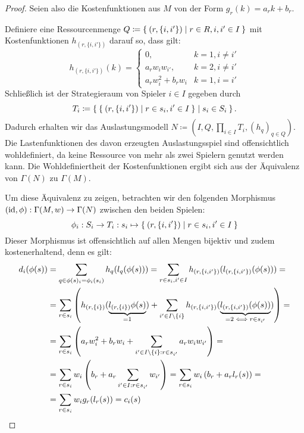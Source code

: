 \begin{proof}
	Seien also die Kostenfunktionen aus $M$ von der Form $g_r(k) = a_r k + b_r$.
	
	Definiere eine Ressourcenmenge $Q \coloneqq \Set{(r, \{i, i'\}) | r \in R, i,i' \in I}$ mit Kostenfunktionen $h_{(r, \{i,i'\})}$ darauf so, dass gilt:
		\[h_{(r, \{i,i'\})} (k) = \begin{cases}
									0, 					& k=1, i \neq i' \\
									a_r w_i w_{i'}, 	& k=2, i \neq i' \\
									a_r w_i^2 + b_r w_i	& k=1, i = i'
								\end{cases} \]
	Schließlich ist der Strategieraum von Spieler $i \in I$ gegeben durch 
		\[T_i \coloneqq \Set{\Set{(r, \{i, i'\}) | r \in s_i, i' \in I} | s_i \in S_i }.\]
	Dadurch erhalten wir das Auslastungsmodell $N \coloneqq (I, Q, \prod_{i \in I} T_i, (h_q)_{q \in Q})$. Die Lastenfunktionen des davon erzeugten Auslastungsspiel sind offensichtlich wohldefiniert, da keine Ressource von mehr als zwei Spielern genutzt werden kann. Die Wohldefiniertheit der Kostenfunktionen ergibt sich aus der Äquivalenz von $\Gamma(N)$ zu $\Gamma(M)$.
	
	Um diese Äquivalenz zu zeigen, betrachten wir den folgenden Morphismus $(\mathrm{id}, \phi): \Gamma(M,w) \to \Gamma(N)$ zwischen den beiden Spielen:
	\[\phi_i: S_i \to T_i: s_i \mapsto \Set{(r, \{i, i'\}) | r \in s_i, i' \in I}\]
	Dieser Morphismus ist offensichtlich auf allen Mengen bijektiv und zudem kostenerhaltend, denn es gilt:
	\begin{align*}
	d_i(\phi(s)) 	&= \sum_{q \in \phi(s)_i = \phi_i(s_i)} h_q(l_q(\phi(s))) = \sum_{r \in s_i, i' \in I} h_{(r, \{i,i'\})}(l_{(r, \{i,i'\})}(\phi(s))) = \\
	&= \sum_{r \in s_i} \left(h_{(r, \{i\})}(\underbrace{l_{(r, \{i\})}\phi(s)}_{=1}) + \sum_{i' \in I\setminus\{i\}} h_{(r, \{i, i'\})}(\underbrace{l_{(r, \{i, i'\})}(\phi(s))}_{=2 \iff r \in s_{i'}})\right) = \\
	&= \sum_{r \in s_i}\left( a_r w_i^2 + b_r w_i + \sum_{i' \in I\setminus\{i\}: r \in s_{i'}} a_r w_i w_{i'}\right) = \\
	&= \sum_{r \in s_i}w_i \left( b_r + a_r \sum_{i' \in I: r \in s_{i'}}w_{i'} \right) = \sum_{r \in s_i}w_i \left( b_r + a_r l_r(s)\right) = \\
	&= \sum_{r \in s_i}w_i g_r(l_r(s)) = c_i(s) \qedhere
	\end{align*}
\end{proof}

